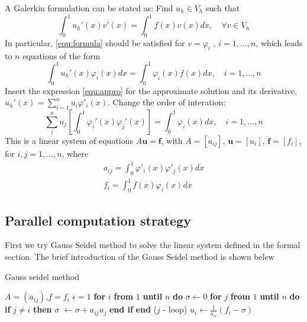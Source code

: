 \documentclass[11pt]{article}
\begin{document}
A Galerkin formulation can be stated as: Find $u_h \in V_h$ such that
\begin{equation}\label{equ:formula}
	\int_0^1u_h'(x)v'(x) = \int_0^1f(x)v(x) dx, \quad \forall v \in V_h 
\end{equation}
In particular, \eqref{equ:formula} should be satisfied for $v = \varphi_i$ , $i = 1,...,n$, which leads to $n$ equations of the form
\begin{equation}
	\int_0^1 u_h'(x)\varphi_i(x)dx = \int_0^1\varphi_i(x)f(x)dx, \quad i = 1,...,n
\end{equation}
Insert the expression \eqref{equ:appro} for the approximate solution and its derivative, $u_h'(x) = \sum_{i=1}^n u_i\varphi'_i(x)$.
Change the order of interation:
\begin{equation}
	\sum_i^n u_j\left[\int_0^1\varphi_i'(x) \varphi_j'(x)\right]= \int_0^1\varphi_i(x) dx, \quad i = 1,...,n
\end{equation}
This is a linear system of equations $A\mathbf{u} = \mathbf{f}$, with $A = [a_{ij}]$, $\mathbf{u} = [u_i]$, $\mathbf{f} = [f_i]$, for $i,j = 1,...,n$, where
\begin{align}
	a_{ij} = \int_0^1\varphi'_i(x)\varphi'_j(x)dx \\
	f_i  = \int_0^1f(x)\varphi_i(x) dx
\end{align}

\subsection{Parallel computation strategy}
First we try Gauss Seidel method to solve the linear system defined in the formal section. The brief introduction of the Gauss Seidel method is shown belew
\begin{algorithm}
\caption{Gauss seidel method}\label{alg:gauss_seidel}
\begin{algorithmic}
\Require $A = (a_{ij})$,$f = f_i$
\State $\epsilon=1$
\State \textbf{for} $i$ \textbf{from} $1$ \textbf{until} $n$ \textbf{do}
\State \quad $\sigma \leftarrow 0$
\State \quad \textbf{for} $j$ \textbf{from} $1$ \textbf{until} $n$ \textbf{do}
\State \quad \quad \textbf{if} $j \neq i$
\textbf{then}
\State \quad  \quad  $\sigma$ $\leftarrow \sigma + a_{ij}u_j$
\State \quad  \quad \textbf{end if}
\State \quad \textbf{end} ($j$ - loop)
\State $u_i \leftarrow \frac{1}{a_{ii}} (f_i - \sigma)$
\EndWhile
\end{algorithmic}
\end{algorithm}
\end{document}
